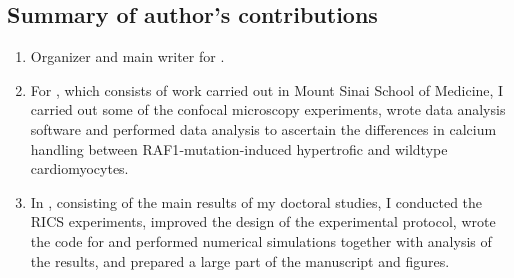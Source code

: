 
\subsection*{Summary of author's contributions}

\begin{enumerate}[I]
  \item Organizer and  main writer for \PaperI. 
  \item For \PaperII, which consists of work carried out in Mount Sinai
    School of Medicine, I carried out some of the confocal microscopy experiments, wrote data analysis software and performed data analysis to ascertain the differences in calcium handling between \acs{RAF1}-mutation-induced hypertrofic and wildtype cardiomyocytes.
  \item In \PaperIII, consisting of the main results of my doctoral studies, I conducted the
\ac{RICS} experiments, improved the design of the experimental protocol, wrote the
code for and performed numerical
simulations together with analysis of the results, and prepared a large part of the
manuscript and figures. 
\end{enumerate}
